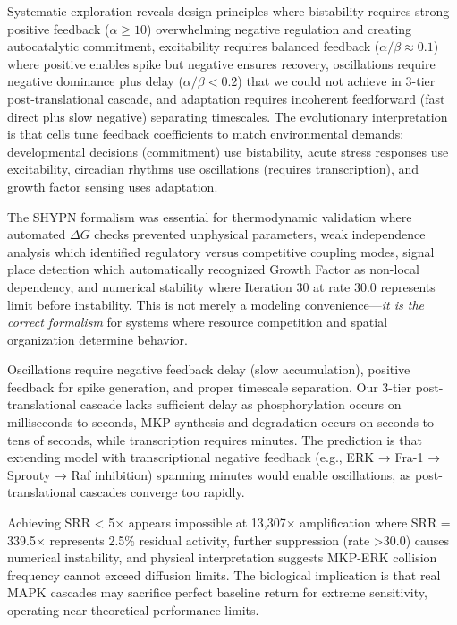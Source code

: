 \documentclass[twocolumn,11pt]{article}
\begin{document}
Systematic exploration reveals design principles where bistability requires strong positive feedback ($\alpha \geq 10$) overwhelming negative regulation and creating autocatalytic commitment, excitability requires balanced feedback ($\alpha/\beta \approx 0.1$) where positive enables spike but negative ensures recovery, oscillations require negative dominance plus delay ($\alpha/\beta < 0.2$) that we could not achieve in 3-tier post-translational cascade, and adaptation requires incoherent feedforward (fast direct plus slow negative) separating timescales. The evolutionary interpretation is that cells tune feedback coefficients to match environmental demands: developmental decisions (commitment) use bistability, acute stress responses use excitability, circadian rhythms use oscillations (requires transcription), and growth factor sensing uses adaptation.

The SHYPN formalism was essential for thermodynamic validation where automated $\Delta G$ checks prevented unphysical parameters, weak independence analysis which identified regulatory versus competitive coupling modes, signal place detection which automatically recognized Growth Factor as non-local dependency, and numerical stability where Iteration 30 at rate 30.0 represents limit before instability. This is not merely a modeling convenience—\textit{it is the correct formalism} for systems where resource competition and spatial organization determine behavior.

Oscillations require negative feedback delay (slow accumulation), positive feedback for spike generation, and proper timescale separation. Our 3-tier post-translational cascade lacks sufficient delay as phosphorylation occurs on milliseconds to seconds, MKP synthesis and degradation occurs on seconds to tens of seconds, while transcription requires minutes. The prediction is that extending model with transcriptional negative feedback (e.g., ERK → Fra-1 → Sprouty → Raf inhibition) spanning minutes would enable oscillations, as post-translational cascades converge too rapidly.

Achieving SRR < 5× appears impossible at 13,307× amplification where SRR = 339.5× represents 2.5\% residual activity, further suppression (rate >30.0) causes numerical instability, and physical interpretation suggests MKP-ERK collision frequency cannot exceed diffusion limits. The biological implication is that real MAPK cascades may sacrifice perfect baseline return for extreme sensitivity, operating near theoretical performance limits.
\end{document}
